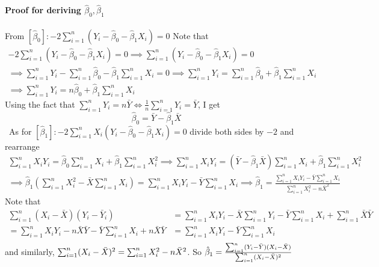 \documentclass[12pt]{article}
\theoremstyle{definition}
\theoremstyle{property}
\theoremstyle{assumption}
\theoremstyle{example}
\theoremstyle{comment}
\begin{document}
\begin{mdframed}[backgroundcolor=blue!5] 
\textbf{Proof for deriving $\hat{\beta}_0,\hat{\beta}_1$}
\\ \\
\footnotesize{From $[\hat{\beta}_0]: -2\sum_{i=1}^n(Y_i-\hat{\beta}_0-\hat{\beta}_1X_i)=0$ Note that 
\begin{gather*}
-2\sum_{i=1}^n(Y_i-\hat{\beta}_0-\hat{\beta}_1X_i)=0 \implies \sum_{i=1}^n(Y_i-\hat{\beta}_0-\hat{\beta}_1X_i)=0 \\
\implies  \sum_{i=1}^n Y_i -\sum_{i=1}^n\hat{\beta}_0 -\hat{\beta}_1\sum_{i=1}^nX_i =0 \implies  \sum_{i=1}^n Y_i =\sum_{i=1}^n\hat{\beta}_0 +\hat{\beta}_1\sum_{i=1}^nX_i \\
\implies  \sum_{i=1}^n Y_i =n\hat{\beta}_0 +\hat{\beta}_1\sum_{i=1}^nX_i
\end{gather*}
Using the fact that $\sum_{i=1}^n Y_i = n\bar{Y} \iff \frac{1}{n}\sum_{i=1}^n Y_i = \bar{Y}$, I get
\[
\hat{\beta}_0=\bar{Y}-\hat{\beta}_1\bar{X}
\]\
As for $[\hat{\beta}_1]: -2\sum_{i=1}^nX_i(Y_i-\hat{\beta}_0-\hat{\beta}_1X_i)=0$ divide both sides by $-2$ and rearrange
\begin{gather*}
\sum_{i=1}^nX_iY_i=\hat{\beta}_0\sum_{i=1}^nX_i +\hat{\beta}_1\sum_{i=1}^nX_i^2\implies \sum_{i=1}^nX_iY_i=(\bar{Y}-\hat{\beta}_1\bar{X})\sum_{i=1}^nX_i +\hat{\beta}_1\sum_{i=1}^nX_i^2\\
\implies\hat{\beta}_1\left(\sum_{i=1}^nX_i^2-\bar{X}\sum_{i=1}^nX_i\right)=\sum_{i=1}^nX_iY_i-\bar{Y}\sum_{i=1}^nX_i
\implies \hat{\beta}_1 = \frac{\sum_{i=1}^nX_iY_i - \bar{Y}\sum_{i=1}^nX_i}{\sum_{i=1}^nX_i^2-n{\bar{X}}^2}
\end{gather*}
Note that 
\[
\begin{aligned}
\sum_{i=1}^n(X_i-\bar{X})(Y_i-\bar{Y}_i) &= \sum_{i=1}^nX_iY_i - \bar{X}\sum_{i=1}^nY_i -\bar{Y}\sum_{i=1}^nX_i +\sum_{i=1}^n\bar{X}\bar{Y} \\
=\sum_{i=1}^nX_iY_i - n\bar{X}\bar{Y} -\bar{Y}\sum_{i=1}^nX_i +n\bar{X}\bar{Y} &= \sum_{i=1}^nX_iY_i - \bar{Y}\sum_{i=1}^nX_i \\
 \end{aligned}
\]}\normalsize
and similarly, $\footnotesize{\sum_{i=1}^n(X_i-\bar{X})^2 = \sum_{i=1}^nX_i^2-n{\bar{X}}^2}\normalsize$. So $\footnotesize{
\hat{\beta}_1=\frac{\sum_{i=1}^n(Y_i-\bar{Y})(X_i-\bar{X})}{\sum_{i=1}^n(X_i-\bar{X})^2}
}$\normalsize
\end{mdframed}
\par



\end{document}
